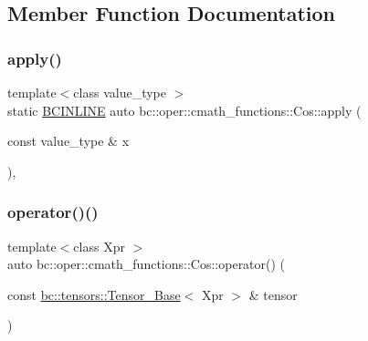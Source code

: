 \subsection{Member Function Documentation}
\mbox{\label{structbc_1_1oper_1_1cmath__functions_1_1Cos_a68eaf94baf5d541506612f3c15898497}} 
\subsubsection{\texorpdfstring{apply()}{apply()}}
{\footnotesize\ttfamily template$<$class value\+\_\+type $>$ \\
static \hyperlink{common_8h_a6699e8b0449da5c0fafb878e59c1d4b1}{B\+C\+I\+N\+L\+I\+NE} auto bc\+::oper\+::cmath\+\_\+functions\+::\+Cos\+::apply (\begin{DoxyParamCaption}\item[{const value\+\_\+type \&}]{x }\end{DoxyParamCaption})\hspace{0.3cm}{\ttfamily [inline]}, {\ttfamily [static]}}

\mbox{\label{structbc_1_1oper_1_1cmath__functions_1_1Cos_adc694e9ccf2b6fc5e1578ee65b07e0e6}} 
\subsubsection{\texorpdfstring{operator()()}{operator()()}\hspace{0.1cm}{\footnotesize\ttfamily [1/3]}}
{\footnotesize\ttfamily template$<$class Xpr $>$ \\
auto bc\+::oper\+::cmath\+\_\+functions\+::\+Cos\+::operator() (\begin{DoxyParamCaption}\item[{const \hyperlink{classbc_1_1tensors_1_1Tensor__Base}{bc\+::tensors\+::\+Tensor\+\_\+\+Base}$<$ Xpr $>$ \&}]{tensor }\end{DoxyParamCaption})\hspace{0.3cm}{\ttfamily [inline]}}

